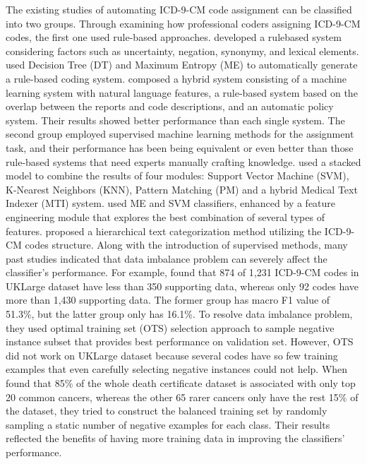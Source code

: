 The existing studies of automating ICD-9-CM code assignment can be classified into two groups. Through examining how professional coders assigning ICD-9-CM codes, the first one used rule-based approaches. \citeauthor{goldstein2007three} \citeyear{goldstein2007three} \cite{goldstein2007three} developed a rulebased system considering factors such as uncertainty, negation, synonymy, and lexical elements.
\citeauthor{farkas2008automatic} \citeyear{farkas2008automatic} \cite{farkas2008automatic} used Decision Tree (DT) and Maximum Entropy (ME) to automatically generate a rule-based coding system. \citeauthor{crammer2007automatic} \citeyear{crammer2007automatic} \cite{crammer2007automatic} composed a hybrid system consisting of a machine learning system with natural language features, a rule-based system based on the overlap between the reports and code descriptions, and an automatic policy system. Their results showed better performance than each single system. The second group employed supervised machine learning methods for the assignment task, and their performance has been being equivalent or even better than those rule-based systems that need experts manually crafting knowledge. \citeauthor{aronson2007indexing} \citeyear{aronson2007indexing} \cite{aronson2007indexing} used a stacked model to combine the results of four modules: Support Vector Machine (SVM), K-Nearest Neighbors (KNN), Pattern Matching (PM) and a hybrid Medical Text Indexer (MTI) system. \citeauthor{patrick2007developing} \citeyear{patrick2007developing} \cite{patrick2007developing} used ME and SVM classifiers, enhanced by a feature engineering module that explores the best combination of several types of features. \citeauthor{zhang2008hierarchical} \citeyear{zhang2008hierarchical} \cite{zhang2008hierarchical} proposed a hierarchical text categorization method utilizing the ICD-9-CM codes structure.
Along with the introduction of supervised methods, many past studies indicated that data imbalance problem can severely affect the classifier’s performance. For example, \citeauthor{kavuluru2015empirical} \citeyear{kavuluru2015empirical} \cite{kavuluru2015empirical} found that 874 of 1,231 ICD-9-CM codes in UKLarge dataset have less than 350 supporting data, whereas only 92 codes have more than 1,430 supporting data. The former group has macro F1 value of 51.3\%, but the latter group only has 16.1\%. To resolve data imbalance problem, they used optimal training set (OTS) selection approach to sample negative instance subset that provides best performance on validation set. However, OTS did not work on UKLarge dataset because several codes have so few training examples that even carefully selecting negative instances could not help. When \citeauthor{koopman2015automatic} \citeyear{koopman2015automatic} \cite{koopman2015automatic} found that 85\% of the whole death certificate dataset is associated with only top 20 common cancers, whereas the other 65 rarer cancers only have the rest 15\% of the dataset, they tried to construct the balanced training set by randomly sampling a static number of negative examples for each class. Their results reflected the benefits of having more training data in improving the classifiers’ performance. 
